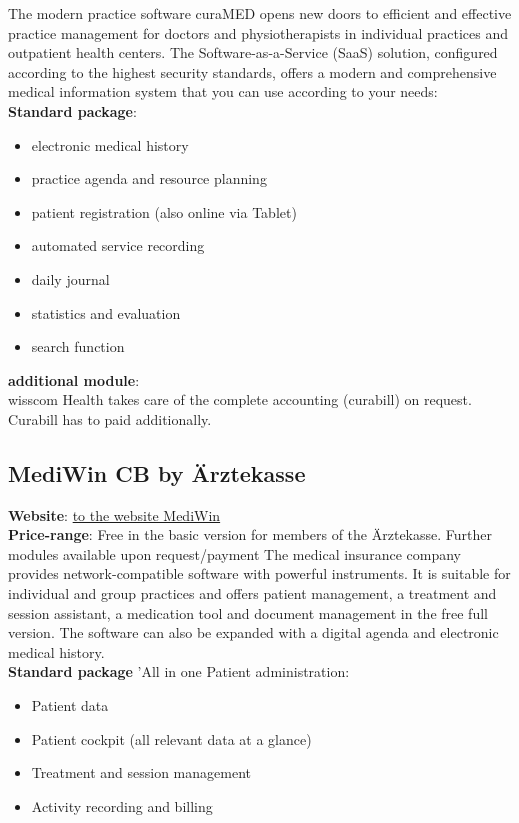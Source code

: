 \documentclass{report}
\begin{document}
The modern practice software curaMED opens new doors to efficient and effective practice management for doctors and physiotherapists in individual 
practices and outpatient health centers. The Software-as-a-Service (SaaS) solution, configured according to the highest security standards, 
offers a modern and comprehensive medical information system that you can use according to your needs:\\
\textbf{Standard package}:
\begin{itemize}
   \item electronic medical history
   \item practice agenda and resource planning
   \item patient registration (also online via Tablet)
   \item automated service recording
   \item daily journal
   \item statistics and evaluation
   \item search function
\end{itemize}

\textbf{additional module}:\\
wisscom Health takes care of the complete accounting (curabill) on request. Curabill has to paid additionally.


\subsection{MediWin CB by Ärztekasse}
\textbf{Website}: \href{https://www.aerztekasse.ch/angebotsuebersicht/informatik/praxissoftware-mediwin-cb/ }{to the website MediWin}\\
\textbf{Price-range}: Free in the basic version for members of the Ärztekasse. Further modules available upon request/payment 
The medical insurance company provides network-compatible software with powerful instruments. It is suitable for individual and group practices and offers patient management, 
a treatment and session assistant, a medication tool and document management in the free full version. The software can also be expanded with a digital agenda and electronic medical history. \\

\textbf{Standard package} 'All in one Patient administration:
\begin{itemize}
   \item Patient data
   \item Patient cockpit (all relevant data at a glance)
   \item Treatment and session management
   \item Activity recording and billing
\end{itemize}
\end{document}
